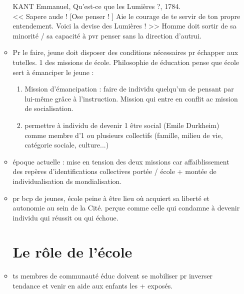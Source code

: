 \documentclass[12pt]{report}
\begin{document}
\begin{itemize}
\begin{itemize}
{\begin{minipage}{18cm}
KANT Emmanuel, Qu'est-ce que les Lumières ?, 1784. \\

<< Sapere aude ! [Ose penser ! ] Aie le courage de te servir de ton propre entendement. Voici la devise des Lumières ! >> Homme doit sortir de sa minorité / sa capacité à pvr penser sans la direction d'autrui.\\
\end{minipage}
}

\vspace{0.5cm}

\item Pr le faire, jeune doit disposer des conditions nécessaires pr échapper aux tutelles. 1 des missions de école. Philosophie de éducation pense que école sert à émanciper le jeune : 
\begin{enumerate}
\item Mission d'émancipation : faire de individu quelqu'un de pensant par lui-même grâce à l'instruction. Mission qui entre en conflit ac mission de socialisation. \\
\item permettre à individu de devenir 1 être social (Emile Durkheim) comme membre d'1 ou plusieurs collectifs (famille, milieu de vie, catégorie sociale, culture...)
\end{enumerate}

\item époque actuelle : mise en tension des deux missions car affaiblissement des repères d'identifications collectives portée / école + montée de individualisation ds mondialisation.\\

\item pr bcp de jeunes, école peine à être lieu où acquiert sa liberté et autonomie au sein de la Cité. perçue comme celle qui condamne à devenir individu qui réussit ou qui échoue. \\

\section{Le rôle de l'école}


\item ts membres de communauté éduc doivent se mobiliser pr inverser tendance et venir en aide aux enfants les + exposés.\\

\end{itemize}
\end{itemize}
\end{document}
